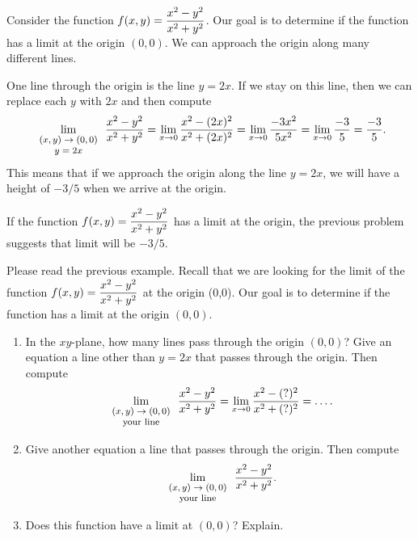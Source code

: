 \begin{example}
 Consider the function $\displaystyle f(x,y)=\frac{x^2-y^2}{x^2+y^2}$.
Our goal is to determine if the function has a limit at the origin $(0,0)$. We can approach the origin along many different lines.

One line through the origin is the line $y=2x$. If we stay on this line, then we can replace each $y$ with $2x$ and then compute
$$\displaystyle\lim_{\text{\footnotesize $\begin{array}{c}(x,y)\to(0,0)\\ y=2x\end{array}$}}\frac{x^2-y^2}{x^2+y^2} 
= \lim_{x\to 0} \frac{x^2-(2x)^2}{x^2+(2x)^2}
= \lim_{x\to 0} \frac{-3x^2}{5x^2}
= \lim_{x\to 0} \frac{-3}{5}
=\frac{-3}{5}.$$
This means that if we approach the origin along the line $y=2x$, we will have a height of $-3/5$ when we arrive at the origin.
\end{example}
If the function $\displaystyle f(x,y)=\frac{x^2-y^2}{x^2+y^2}$ has a limit at the origin, the previous problem suggests that limit will be $-3/5$.
\begin{problem}
 Please read the previous example. Recall that we are looking for the limit of the function $\displaystyle f(x,y)=\frac{x^2-y^2}{x^2+y^2}$ at the origin (0,0). 
Our goal is to determine if the function has a limit at the origin $(0,0)$.
\begin{enumerate}
 \item In the $xy$-plane, how many lines pass through the origin $(0,0)$? Give an equation a line other than $y=2x$ that passes through the origin.  Then compute $$\displaystyle\lim_{\text{\footnotesize $\begin{array}{c}(x,y)\to(0,0)\\ \text{your line}\end{array}$}}\frac{x^2-y^2}{x^2+y^2}
= \lim_{x\to 0} \frac{x^2-(?)^2}{x^2+(?)^2}=\ldots.$$
 \item Give another equation a line that passes through the origin.  Then compute $$\displaystyle\lim_{\text{\footnotesize $\begin{array}{c}(x,y)\to(0,0)\\ \text{your line}\end{array}$}}\frac{x^2-y^2}{x^2+y^2}.$$
 \item Does this function have a limit at $(0,0)$? Explain. %
\end{enumerate}
\end{problem}


